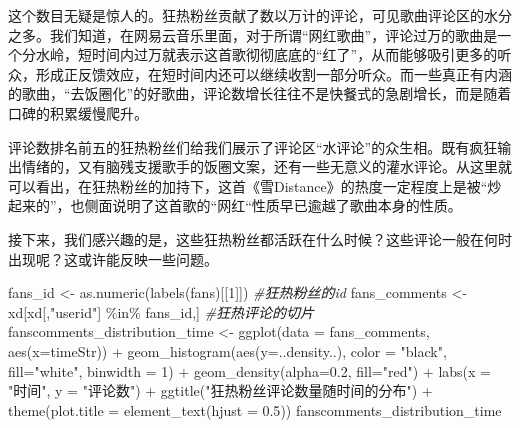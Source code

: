 \documentclass[
]{article}
\newenvironment{Shaded}{\begin{snugshade}}{\end{snugshade}}
\newcommand{\AttributeTok}[1]{\textcolor[rgb]{0.77,0.63,0.00}{#1}}
\newcommand{\CommentTok}[1]{\textcolor[rgb]{0.56,0.35,0.01}{\textit{#1}}}
\newcommand{\DecValTok}[1]{\textcolor[rgb]{0.00,0.00,0.81}{#1}}
\newcommand{\FloatTok}[1]{\textcolor[rgb]{0.00,0.00,0.81}{#1}}
\newcommand{\FunctionTok}[1]{\textcolor[rgb]{0.00,0.00,0.00}{#1}}
\newcommand{\NormalTok}[1]{#1}
\newcommand{\OtherTok}[1]{\textcolor[rgb]{0.56,0.35,0.01}{#1}}
\newcommand{\SpecialCharTok}[1]{\textcolor[rgb]{0.00,0.00,0.00}{#1}}
\newcommand{\StringTok}[1]{\textcolor[rgb]{0.31,0.60,0.02}{#1}}
\begin{document}
这个数目无疑是惊人的。狂热粉丝贡献了数以万计的评论，可见歌曲评论区的水分之多。我们知道，在网易云音乐里面，对于所谓``网红歌曲''，评论过万的歌曲是一个分水岭，短时间内过万就表示这首歌彻彻底底的``红了''，从而能够吸引更多的听众，形成正反馈效应，在短时间内还可以继续收割一部分听众。而一些真正有内涵的歌曲，``去饭圈化''的好歌曲，评论数增长往往不是快餐式的急剧增长，而是随着口碑的积累缓慢爬升。

评论数排名前五的狂热粉丝们给我们展示了评论区``水评论''的众生相。既有疯狂输出情绪的，又有脑残支援歌手的饭圈文案，还有一些无意义的灌水评论。从这里就可以看出，在狂热粉丝的加持下，这首《雪Distance》的热度一定程度上是被``炒起来的''，也侧面说明了这首歌的``网红``性质早已逾越了歌曲本身的性质。

接下来，我们感兴趣的是，这些狂热粉丝都活跃在什么时候？这些评论一般在何时出现呢？这或许能反映一些问题。

\begin{Shaded}
\begin{Highlighting}[]
\NormalTok{fans\_id }\OtherTok{\textless{}{-}} \FunctionTok{as.numeric}\NormalTok{(}\FunctionTok{labels}\NormalTok{(fans)[[}\DecValTok{1}\NormalTok{]]) }\CommentTok{\#狂热粉丝的id}
\NormalTok{fans\_comments }\OtherTok{\textless{}{-}}\NormalTok{ xd[xd[,}\StringTok{"userid"}\NormalTok{] }\SpecialCharTok{\%in\%}\NormalTok{ fans\_id,] }\CommentTok{\#狂热评论的切片}
\NormalTok{fanscomments\_distribution\_time }\OtherTok{\textless{}{-}} \FunctionTok{ggplot}\NormalTok{(}\AttributeTok{data =}\NormalTok{ fans\_comments, }\FunctionTok{aes}\NormalTok{(}\AttributeTok{x=}\NormalTok{timeStr)) }\SpecialCharTok{+} \FunctionTok{geom\_histogram}\NormalTok{(}\FunctionTok{aes}\NormalTok{(}\AttributeTok{y=}\NormalTok{..density..), }\AttributeTok{color =} \StringTok{"black"}\NormalTok{, }\AttributeTok{fill=}\StringTok{"white"}\NormalTok{, }\AttributeTok{binwidth =} \DecValTok{1}\NormalTok{) }\SpecialCharTok{+} 
 \FunctionTok{geom\_density}\NormalTok{(}\AttributeTok{alpha=}\FloatTok{0.2}\NormalTok{, }\AttributeTok{fill=}\StringTok{"red"}\NormalTok{) }\SpecialCharTok{+} \FunctionTok{labs}\NormalTok{(}\AttributeTok{x =} \StringTok{"时间"}\NormalTok{, }\AttributeTok{y =} \StringTok{"评论数"}\NormalTok{) }\SpecialCharTok{+} \FunctionTok{ggtitle}\NormalTok{(}\StringTok{"狂热粉丝评论数量随时间的分布"}\NormalTok{) }\SpecialCharTok{+} \FunctionTok{theme}\NormalTok{(}\AttributeTok{plot.title =} \FunctionTok{element\_text}\NormalTok{(}\AttributeTok{hjust =} \FloatTok{0.5}\NormalTok{))}
\NormalTok{fanscomments\_distribution\_time}
\end{Highlighting}
\end{Shaded}
\end{document}

